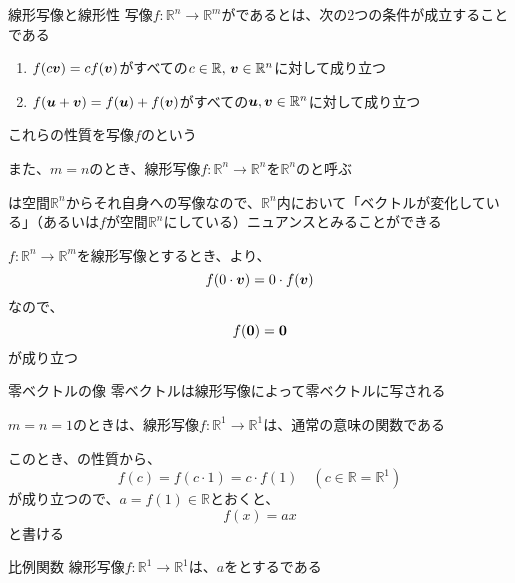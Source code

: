 \documentclass[b5paper,12pt]{jsarticle}
\begin{document}
\begin{definition}{線形写像と線形性}
  写像$f\colon \mathbb{R}^n \to \mathbb{R}^m$がであるとは、次の2つの条件が成立することである
  \begin{enumerate}[label=\romanlabel]
    \item $f(c\vb*{v}) = cf(\vb*{v})$がすべての$c \in \mathbb{R} , \, \vb*{v} \in \mathbb{R}^n$に対して成り立つ
    \item $f(\vb*{u} + \vb*{v}) = f(\vb*{u}) + f(\vb*{v})$がすべての$\vb*{u}, \vb*{v} \in \mathbb{R}^n$に対して成り立つ
  \end{enumerate}
  これらの性質を写像$f$のという

  また、$m=n$のとき、線形写像$f\colon \mathbb{R}^n \to \mathbb{R}^n$を$\mathbb{R}^n$のと呼ぶ
\end{definition}

は空間$\mathbb{R}^n$からそれ自身への写像なので、$\mathbb{R}^n$内において「ベクトルが変化している」（あるいは$f$が空間$\mathbb{R}^n$にしている）ニュアンスとみることができる

\sectionline

$f\colon \mathbb{R}^n \to \mathbb{R}^m$を線形写像とするとき、より、
\begin{equation*}
  f(0 \cdot \vb*{v}) = 0 \cdot f(\vb*{v})
\end{equation*}
なので、
\begin{equation*}
  f(\vb*{0}) = \vb*{0}
\end{equation*}
が成り立つ

\begin{theorem}{零ベクトルの像}
  零ベクトルは線形写像によって零ベクトルに写される
\end{theorem}

\sectionline

$m=n=1$のときは、線形写像$f\colon \mathbb{R}^1 \to \mathbb{R}^1$は、通常の意味の関数である

このとき、の性質から、
\begin{equation*}
  f(c) = f(c \cdot 1) = c \cdot f(1) \quad (c \in \mathbb{R} = \mathbb{R}^1)
\end{equation*}
が成り立つので、$a = f(1) \in \mathbb{R}$とおくと、
\begin{equation*}
  f(x) = ax
\end{equation*}
と書ける

\begin{theorem}{比例関数}
  線形写像$f\colon \mathbb{R}^1 \to \mathbb{R}^1$は、$a$をとするである
\end{theorem}
\end{document}
